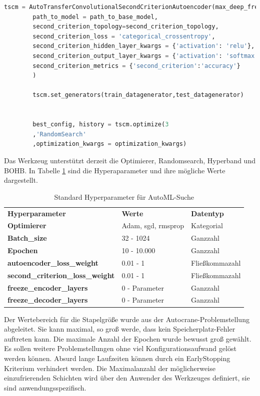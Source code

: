 		\begin{lstlisting}[language=python,caption=Beispiel AutoTransferSecondCriterionAutoenocder in Python, label=lst:BspAutoTransferSecondCriterionAutoenocder]
		tscm = AutoTransferConvolutionalSecondCriterionAutoencoder(max_deep_freeze=2,
		path_to_model = path_to_base_model,            
		second_criterion_topology=second_criterion_topology,
		second_criterion_loss = 'categorical_crossentropy',                                                                                                   
		second_criterion_hidden_layer_kwargs = {'activation': 'relu'},
		second_criterion_output_layer_kwargs = {'activation': 'softmax'},
		second_criterion_metrics = {'second_criterion':'accuracy'}
		)
		
		tscm.set_generators(train_datagenerator,test_datagenerator)
		
		
		best_config, history = tscm.optimize(3
		,'RandomSearch'
		,optimization_kwargs = optimization_kwargs)
		\end{lstlisting}
		Das Werkzeug unterstützt derzeit die Optimierer, Randomsearch, Hyperband und BOHB.	In Tabelle \ref{table:HyperparparameterAutoML} sind die Hyperaparameter und ihre mögliche Werte dargestellt.
		\begin{table}[ht]
			\centering
			\begin{tabularx}{\textwidth}{lll}
				\textbf{Hyperparameter} & \textbf{Werte}  & \textbf{Datentyp} 					 	\\
				\textbf{Optimierer}   & 	Adam, sgd, rmsprop		&	Kategorial			\\
				\textbf{Batch\_size}  &  32 - 1024					 &	Ganzzahl			        \\
				\textbf{Epochen}	 &  10 - 10.000				 &	Ganzzahl					 	\\
				\textbf{autoencoder\_loss\_weight}	 	  &  0.01 - 1	 &	Fließkommazahl	\\
				\textbf{second\_criterion\_loss\_weight}	& 0.01 - 1  &	Fließkommazahl	 \\
				\textbf{freeze\_encoder\_layers}	 	  &  0 - Parameter  &	Ganzzahl						\\
				\textbf{freeze\_decoder\_layers}	 	  &  0 - Parameter &	Ganzzahl								
			\end{tabularx}
			\caption{Standard Hyperparameter für AutoML-Suche}
			\label{table:HyperparparameterAutoML}
		\end{table}
		Der Wertebereich für die Stapelgröße wurde aus der Autocrane-Problemstellung abgeleitet. Sie kann maximal, so groß werde, dass kein Speicherplatz-Fehler auftreten kann. Die maximale Anzahl der Epochen wurde bewusst groß gewählt. Es sollen weitere  Problemstellungen ohne viel Konfigurationsaufwand gelöst werden können. Absurd lange Laufzeiten können durch ein EarlyStopping Kriterium verhindert werden. Die Maximalanzahl der möglicherweise einzufrierenden Schichten wird über den Anwender des Werkzeuges definiert, sie sind anwendungsspezifisch.
		

